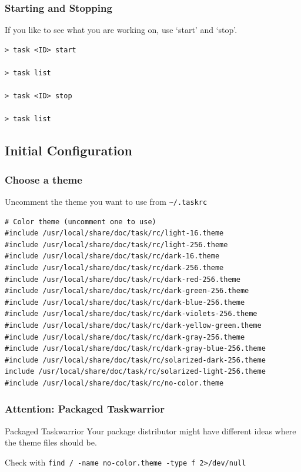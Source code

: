 \documentclass[t,handout,aspectratio=169]{beamer}
\begin{document}
\begin{frame}[fragile]\frametitle{Starting and Stopping}
    \vfill
    If you like to see what you are working on, use `start' and `stop'. \pause
    \begin{lstlisting}
> task <ID> start

> task list

> task <ID> stop

> task list\end{lstlisting}
\end{frame}

\subsection{Initial Configuration}

\begin{frame}[fragile]\frametitle{Choose a theme}
    Uncomment the theme you want to use from \verb+~/.taskrc+
    \begin{lstlisting}
# Color theme (uncomment one to use)
#include /usr/local/share/doc/task/rc/light-16.theme
#include /usr/local/share/doc/task/rc/light-256.theme
#include /usr/local/share/doc/task/rc/dark-16.theme
#include /usr/local/share/doc/task/rc/dark-256.theme
#include /usr/local/share/doc/task/rc/dark-red-256.theme
#include /usr/local/share/doc/task/rc/dark-green-256.theme
#include /usr/local/share/doc/task/rc/dark-blue-256.theme
#include /usr/local/share/doc/task/rc/dark-violets-256.theme
#include /usr/local/share/doc/task/rc/dark-yellow-green.theme
#include /usr/local/share/doc/task/rc/dark-gray-256.theme
#include /usr/local/share/doc/task/rc/dark-gray-blue-256.theme
#include /usr/local/share/doc/task/rc/solarized-dark-256.theme
include /usr/local/share/doc/task/rc/solarized-light-256.theme
#include /usr/local/share/doc/task/rc/no-color.theme\end{lstlisting}
\end{frame}

\begin{frame}[fragile]\frametitle{Attention: Packaged Taskwarrior}
    \vfill
    \begin{alertblock}{Packaged Taskwarrior}
        Your package distributor might have different ideas where the theme files should be.

        Check with \verb+find / -name no-color.theme -type f 2>/dev/null+
    \end{alertblock}
\end{frame}
\end{document}
